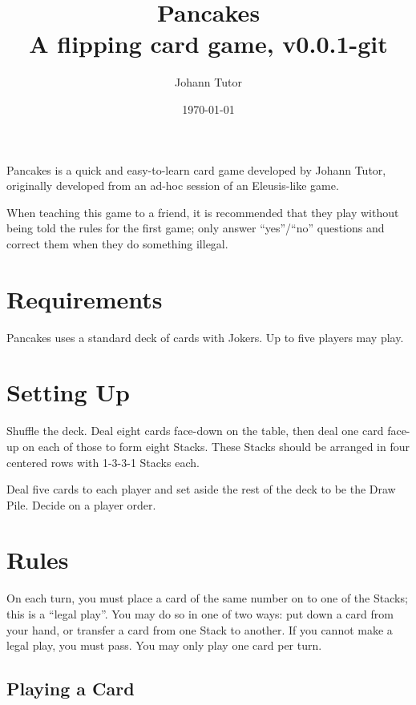 \documentclass{article}
\newcommand\theversion{0.0.1-git}
\begin{document}
\title{Pancakes\\ \large A flipping card game, v\theversion}
\author{Johann Tutor}
\date{\today}
\maketitle

Pancakes is a quick and easy-to-learn card game developed by Johann Tutor, originally developed from an ad-hoc session of an Eleusis-like game.

When teaching this game to a friend, it is recommended that they play without being told the rules for the first game;
only answer ``yes''/``no'' questions and correct them when they do something illegal.

\tableofcontents

\newpage

\section{Requirements}

Pancakes uses a standard deck of cards with Jokers.
Up to five players may play.

\section{Setting Up}
\label{sec:setup}

Shuffle the deck. Deal eight cards face-down on the table, then deal one card face-up on each of those to form eight Stacks.
These Stacks should be arranged in four centered rows with 1-3-3-1 Stacks each.

Deal five cards to each player and set aside the rest of the deck to be the Draw Pile. Decide on a player order.

\section{Rules}

On each turn, you must place a card of the same number on to one of the Stacks; this is a ``legal play''. You may do so in one of two ways: put down a card from your hand, or transfer a card from one Stack to another. If you cannot make a legal play, you must pass. You may only play one card per turn.

\subsection{Playing a Card}
\label{sec:playcard}
\end{document}
